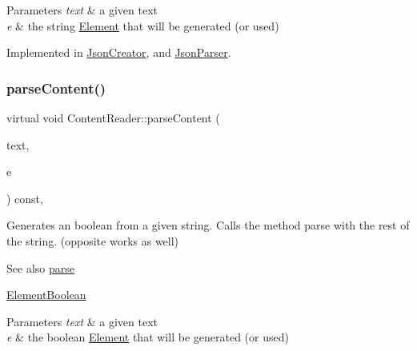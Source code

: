 \begin{DoxyParams}{Parameters}
{\em text} & a given text \\
\hline
{\em e} & the string \mbox{\hyperlink{classElement}{Element}} that will be generated (or used) \\
\hline
\end{DoxyParams}


Implemented in \mbox{\hyperlink{classJsonCreator_acf8d7cd3dcbb669fd9eb5dec95e069f3}{Json\+Creator}}, and \mbox{\hyperlink{classJsonParser_a94737a7518f05e4ed43a753f4148b354}{Json\+Parser}}.

\mbox{\label{classContentReader_a3ee0aec579c723f17742e10fe7c75e39}} 
\subsubsection{\texorpdfstring{parse\+Content()}{parseContent()}\hspace{0.1cm}{\footnotesize\ttfamily [3/6]}}
{\footnotesize\ttfamily virtual void Content\+Reader\+::parse\+Content (\begin{DoxyParamCaption}\item[{std\+::string \&}]{text,  }\item[{\mbox{\hyperlink{classElementBoolean}{Element\+Boolean}} $\ast$}]{e }\end{DoxyParamCaption}) const\hspace{0.3cm}{\ttfamily [pure virtual]}, {\ttfamily [inherited]}}

Generates an boolean from a given string. Calls the method parse with the rest of the string. (opposite works as well) \begin{DoxySeeAlso}{See also}
\mbox{\hyperlink{classContentReader_a7fff2e63a2e8fa216665604f69974e1d}{parse}} 

\mbox{\hyperlink{classElementBoolean}{Element\+Boolean}}
\end{DoxySeeAlso}

\begin{DoxyParams}{Parameters}
{\em text} & a given text \\
\hline
{\em e} & the boolean \mbox{\hyperlink{classElement}{Element}} that will be generated (or used) \\
\hline
\end{DoxyParams}


